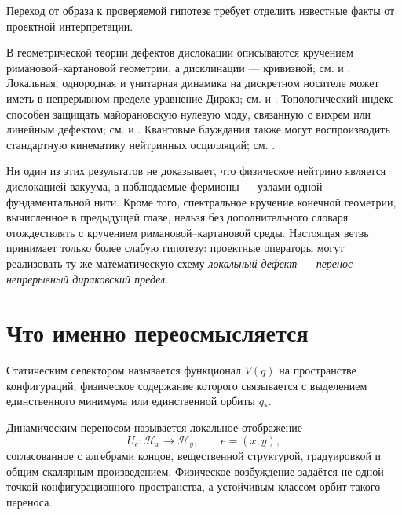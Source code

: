 Переход от образа к проверяемой гипотезе требует отделить известные факты
от проектной интерпретации.

В геометрической теории дефектов дислокации описываются кручением
римановой--картановой геометрии, а дисклинации --- кривизной; см.
 и . Локальная,
однородная и унитарная динамика на дискретном носителе может иметь в
непрерывном пределе уравнение Дирака; см.  и
. Топологический индекс способен защищать
майорановскую нулевую моду, связанную с вихрем или линейным дефектом; см.
 и . Квантовые блуждания также
могут воспроизводить стандартную кинематику нейтринных осцилляций; см.
.

Ни один из этих результатов не доказывает, что физическое нейтрино является
дислокацией вакуума, а наблюдаемые фермионы --- узлами одной фундаментальной
нити. Кроме того, спектральное кручение конечной геометрии, вычисленное в
предыдущей главе, нельзя без дополнительного словаря отождествлять с
кручением римановой--картановой среды. Настоящая ветвь принимает только
более слабую гипотезу: проектные операторы могут реализовать ту же
математическую схему \emph{локальный дефект --- перенос --- непрерывный
дираковский предел}.

\section{Что именно переосмысляется}

\begin{definition}
Статическим селектором называется функционал $V(q)$ на пространстве
конфигураций, физическое содержание которого связывается с выделением
единственного минимума или единственной орбиты $q_*$.
\end{definition}

\begin{definition}
Динамическим переносом называется локальное отображение
\begin{equation}
 U_e:\mathcal H_x\longrightarrow\mathcal H_y,
 \qquad e=(x,y),
 \label{eq:v5-local-transfer}
\end{equation}
согласованное с алгебрами концов, вещественной структурой, градуировкой и
общим скалярным произведением. Физическое возбуждение задаётся не одной
точкой конфигурационного пространства, а устойчивым классом орбит такого
переноса.
\end{definition}

